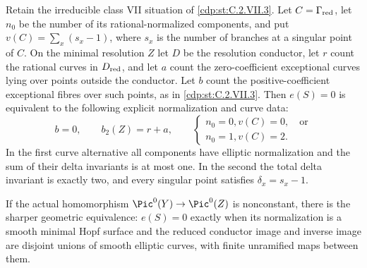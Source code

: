 \begin{proposition}\label{cdp:st:C.2.VII.4}


Retain the irreducible class VII situation of
\ref{cdp:st:C.2.VII.3}. Let $C=\Gamma_{\rm red}$, let $n_0$
be the number of its rational-normalized components,
and put $v(C)=\sum_x(s_x-1)$, where $s_x$ is the
number of branches at a singular point of $C$.
On the minimal resolution $Z$ let $D$ be the
resolution conductor, let $r$ count the rational
curves in $D_{\rm red}$, and let $a$ count the
zero-coefficient exceptional curves lying over
points outside the conductor. Let $b$ count the
positive-coefficient exceptional fibres over
such points, as in \ref{cdp:st:C.2.VII.3}. Then $e(S)=0$
is equivalent to the following explicit
normalization and curve data:
\[
 b=0,\qquad b_2(Z)=r+a,
 \qquad
 \begin{cases}
 n_0=0, v(C)=0,\quad\text{or}\\
 n_0=1, v(C)=2.
 \end{cases}
 \tag{C.VII.9}\label{cdp:eq:C.VII.9}
\]
In the first curve alternative all components
have elliptic normalization and the sum of
their delta invariants is at most one. In the
second the total delta invariant is exactly
two, and every singular point satisfies
$\delta_x=s_x-1$.

If the actual homomorphism
$\Pic^0(Y)\to\Pic^0(Z)$ is nonconstant,
there is the sharper geometric equivalence:
$e(S)=0$ exactly when its normalization is a
smooth minimal Hopf surface and the reduced
conductor image and inverse image are disjoint
unions of smooth elliptic curves, with finite
unramified maps between them.
\end{proposition}


